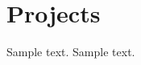 

\section{Projects}\label{sec:projects}
\resumeSubHeadingListStart
        {Sample text.}
        {Sample text.}
\resumeSubHeadingListEnd
